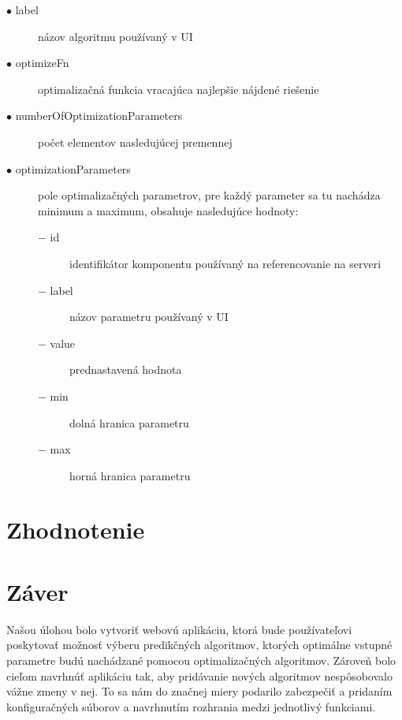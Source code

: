 \documentclass[a4paper,slovak,12pt,appendix]{article}
\begin{document}
\begin{description}
  \item[$\bullet$ label] názov algoritmu používaný v UI
  \item[$\bullet$ optimizeFn] optimalizačná funkcia vracajúca najlepšie nájdené riešenie
  \item[$\bullet$ numberOfOptimizationParameters] počet elementov nasledujúcej premennej
  \item[$\bullet$ optimizationParameters] pole optimalizačných parametrov, pre každý parameter sa
  tu nachádza minimum a maximum, obsahuje nasledujúce hodnoty:
  \begin{description}
    \item[$-$ id] identifikátor komponentu používaný na referencovanie na serveri
    \item[$-$ label] názov parametru používaný v UI
    \item[$-$ value] prednastavená hodnota
    \item[$-$ min] dolná hranica parametru
    \item[$-$ max] horná hranica parametru
  \end{description}
\end{description}


\newpage
\section{Zhodnotenie}
\label{evaluation}



\newpage
\section{Záver}
\label{conclusion}
Našou úlohou bolo vytvoriť webovú aplikáciu, ktorá bude používateľovi poskytovať
možnosť výberu predikčných algoritmov, ktorých optimálne vstupné parametre budú
nachádzané pomocou optimalizačných algoritmov. Zároveň bolo cieľom navrhnúť
aplikáciu tak, aby pridávanie nových algoritmov nespôsobovalo vážne zmeny v nej.
To sa nám do značnej miery podarilo zabezpečiť a pridaním konfiguračných
súborov a navrhnutím rozhrania medzi jednotlivý funkciami. 
\end{document}
